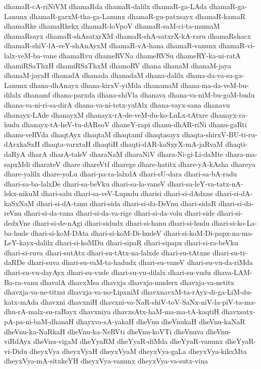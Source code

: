 {dhamaR-cA-riNiVM
dhamaRda
dhamaR-dalilx
dhamaR-ga-LAda
dhamaR-ga-Lanunx
dhamaR-garxM-tha-ga-Lanunx
dhamaR-gu-patxsayx
dhamaR-kamaR
dhamaRke
dhamaRkekx
dhamaR-loVpoV
dhamaR-saM-ci-ta-mumaM
dhamaRsayx
dhamaR-shAsatxrXM
dhamaR-shA-satxrX-kA-raru
dhamaRshacx
dhamaR-shiV-lA-veY-shAnAyxM
dhamaR-vA-hana
dhamaR-vanunx
dhamaR-vi-lalx-veM-ba-vane
dhamaRvu
dhameRVNa
dhameRVSu
dhameRY-ka-ni-ratA
dhamiRSaThxH
dhamiRSaThxM
dhamoRV
dhana
dhanaM
dhanaM-jaya
dhanaM-jayaH
dhanadA
dhanada
dhanadaM
dhana-dalilx
dhana-da-va-sa-ga-Lanunx
dhana-dhAnayx
dhana-kirxV-yiMda
dhanamaM
dhana-ma-da-veM-bu-dilalx
dhanamf
dhana-parxda
dhana-shiVla
dhanava
dhana-va-niM-bu-goM-budu
dhana-va-ni-ri-sa-dirA
dhana-va-ni-tetx-yalAlx
dhana-vayx-sana
dhanavu
dhanayx-LAde
dhanayxM
dhanayx-rA-de-veM-du-ko-LuLx-tAtxre
dhanayx-ra-hudu
dhanayx-tA-heV-tu-dARsoV
dhaneY-rapi
dhanu-dhAR-riNi
dhanu-gaRti
dhanu-veRVda
dhaqtAyx
dhaqtaM
dhaqtamf
dhaqtasayx
dhaqta-shirxV-BU-ti-ru-dArxkaSxH
dhaqta-varxtaH
dhaqtiH
dhaqti-dAR-kaSxyX-mA-jaRvaM
dhaqti-daRyA
dharA
dharA-taleV
dharaNaM
dharaNiV
dhara-Ni-gi-Li-daMte
dhara-ma-sapxMdi
dharateV
dhare
dhareVtf
dharege
dhare-hatitx
dhare-yA-kAsha
dhareya
dhare-yalilx
dhare-yoLu
dhari-pa-ra-lalxdA
dhari-sU-dara
dhari-sa-bA-radu
dhari-sa-ba-lalxDe
dhari-sa-beVku
dhari-sa-la-vaneV
dhari-sa-leY-va-tatx-nA-lekx-nikuM
dhari-salu
dhari-sa-veV-Lupxdu
dharisi
dhari-si-dAdxne
dhari-si-dA-kaSxNaM
dhari-si-dA-tanu
dhari-sida
dhari-si-da-DeVnu
dhari-sidaR
dhari-si-da-reVnu
dhari-si-da-vana
dhari-si-da-va-rige
dhari-si-da-volu
dhari-side
dhari-si-dedxVne
dhari-si-de-nAgi
dhari-sidudx
dhari-si-hanu
dhari-si-hudu
dhari-si-ko-La-ba-hude
dhari-si-koM-DAta
dhari-si-koM-Di-hudeV
dhari-si-koM-Di-papx-na-ma-LeY-kayx-dalilx
dhari-si-koMDu
dhari-sipaR
dhari-sipapx
dhari-si-ra-beVku
dhari-si-ruva
dhari-sutAtx
dhari-su-tAtx-na-lalxde
dhari-su-tAtxne
dhari-su-ti-daRDe
dhari-suva
dhari-su-vaM-ta-hadudx
dhari-su-vaneV
dhari-su-vu-da-riMda
dhari-su-vu-dayAyx
dhari-su-vude
dhari-su-vu-dilalx
dhari-su-vudu
dhava-LAM-Ba-ra-vanu
dhavalA
dhavxMsa
dhavxja
dhavxja-muderx
dhavxja-va-netitx
dhavxja-va-ne-titxsi
dhavxja-va-no-LipxniM
dhavxnavxM-ta-rAyx-di-ga-LiM-du-katx-mAda
dhavxni
dhavxniH
dhavxni-va-NaR-shiV-toV-SaNx-niV-la-piV-ta-ma-dhu-rA-malx-su-raBayx
dhavxniya
dhavxsAtx-haM-ma-ma-tA-kaqtiH
dhavxsatx-pA-pa-ni-baM-dhanaH
dhayxva-sA-yakaH
dheVnu
dheVnukaH
dheVnu-kaNaR
dheVnu-ka-NaRkaH
dheVnu-ka-NeRVti
dheVnu-koVTi
dheVnuva
dheVnu-viRdAyx
dheVnu-vigaM
dheYyaRM
dheYyaR-diMda
dheYyaR-vanunx
dheYyaR-vi-Didu
dheyxVya
dheyxVyaH
dheyxVyaM
dheyxVya-gaLa
dheyxVya-kikxMta
dheyxVya-mA-sitxkeYH
dheyxVya-vanunx
dheyxVya-va-sutx-vina
}
